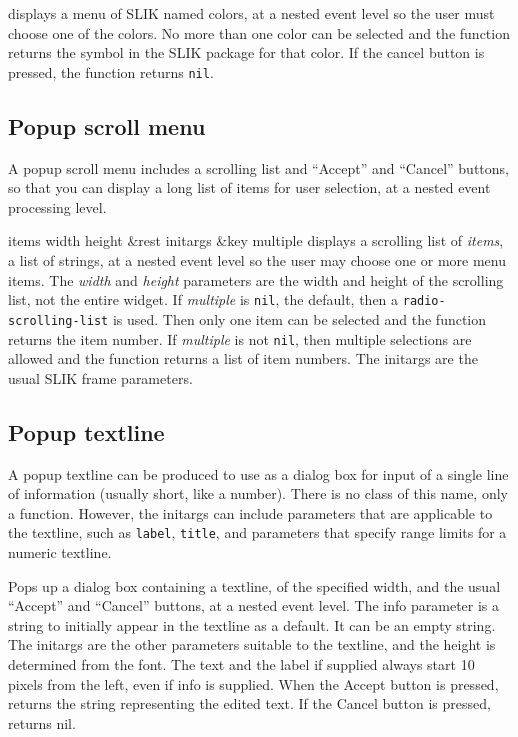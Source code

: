 \documentclass[twoside,openright,11pt]{report}
\newcommand{\tp}[1]{\texttt{#1}}
\begin{document}
{displays a menu of SLIK named colors, at a nested event level so the
user must choose one of the colors.  No more than one color can be
selected and the function returns the symbol in the SLIK package for
that color.  If the cancel button is pressed, the function returns
\tp{nil}.}

\subsection{Popup scroll menu}

A popup scroll menu includes a scrolling list and ``Accept'' and
``Cancel'' buttons, so that you can display a long list of items for
user selection, at a nested event processing level.

{items width height \&rest initargs \&key multiple}
{displays a scrolling list of \emph{items}, a list of strings, at a
nested event level so the user may choose one or more menu items.  The
\emph{width} and \emph{height} parameters are the width and height of
the scrolling list, not the entire widget.  If \emph{multiple} is
\tp{nil}, the default, then a \tp{radio-scrolling-list} is
used.  Then only one item can be selected and the function returns the
item number.  If \emph{multiple} is not \tp{nil}, then multiple
selections are allowed and the function returns a list of item
numbers.  The initargs are the usual SLIK frame parameters.}

\subsection{Popup textline}

A popup textline can be produced to use as a dialog box for input of a
single line of information (usually short, like a number).  There is
no class of this name, only a function.  However, the initargs can
include parameters that are applicable to the textline, such as
\tp{label}, \tp{title}, and parameters that specify range limits for a
numeric textline.

{Pops up a dialog box containing a textline, of the specified width,
and the usual ``Accept'' and ``Cancel'' buttons, at a nested event
level.  The info parameter is a string to initially appear in the
textline as a default.  It can be an empty string.  The initargs are
the other parameters suitable to the textline, and the height is
determined from the font.  The text and the label if supplied always
start 10 pixels from the left, even if info is supplied.  When the
Accept button is pressed, returns the string representing the edited
text.  If the Cancel button is pressed, returns nil.}
\end{document}
